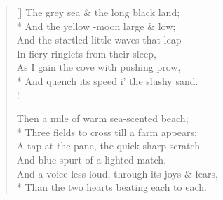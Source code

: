 \documentclass[MAIN]{subfiles}
\begin{document}
\begin{verse}[\versewidth]
The grey sea \& the long black land;\\*
And the yellow -moon large \& low;\\
And the startled little waves that leap\\
In fiery ringlets from their sleep,\\
As I gain the cove with pushing prow,\\*
And quench its speed i' the slushy sand.\\!

Then a mile of warm sea-scented beach;\\*
Three fields to cross till a farm appears;\\
A tap at the pane, the quick sharp scratch\\
And blue spurt of a lighted match,\\
And a voice less loud, through its joys \& fears,\\*
Than the two hearts beating each to each.
\end{verse}
\end{document}
